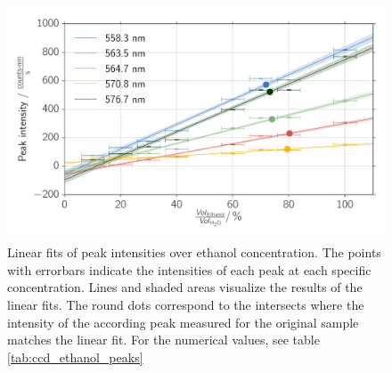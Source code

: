 \begin{figure}[htpb]
    \centering
    \includegraphics[width=0.8\linewidth]{analysis/figures/ccd_ethanol_intensity}
    \caption{
        Linear fits of peak intensities over ethanol concentration. The points with errorbars 
        indicate the intensities of each peak at each specific concentration. Lines 
        and shaded areas visualize the results of the linear fits. The round dots 
        correspond to the intersects where the intensity of the according peak measured 
        for the original sample matches the linear fit. For the numerical values, see table 
        \ref{tab:ccd_ethanol_peaks}
        }
    \label{fig:ccd_ethanol_intensity}
\end{figure}

